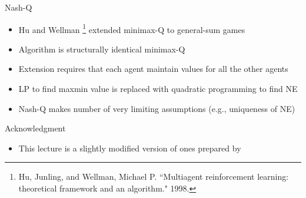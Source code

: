 \documentclass[11pt,aspectratio=169]{beamer}
\begin{document}
  
  \begin{frame}{Nash-Q}
   \begin{itemize}
   \setlength{\itemsep}{1em}
    \item Hu and Wellman%
    \footnote{\tiny Hu, Junling, and Wellman, Michael P. ``Multiagent reinforcement learning: theoretical framework and an algorithm." 1998.}
    extended minimax-Q to general-sum games
    \item Algorithm is structurally identical minimax-Q
    \item Extension requires that each agent maintain values for all the other agents
    \item LP to find maxmin value is replaced with quadratic programming to find NE
    \item Nash-Q makes number of very limiting assumptions (e.g., uniqueness of NE)
   \end{itemize}
  \end{frame}
  

  \begin{frame}{Acknowledgment}
   \begin{itemize}
    \setlength{\itemsep}{1em}
    \item This lecture is a slightly modified version of ones prepared by
   \end{itemize}
  \end{frame}
  
  
\end{document}

